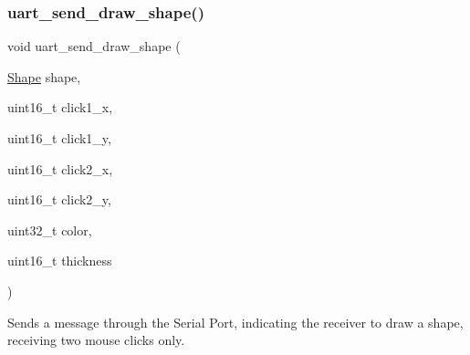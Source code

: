 \subsubsection{\texorpdfstring{uart\+\_\+send\+\_\+draw\+\_\+shape()}{uart\_send\_draw\_shape()}}
{\footnotesize\ttfamily void uart\+\_\+send\+\_\+draw\+\_\+shape (\begin{DoxyParamCaption}\item[{\mbox{\hyperlink{group__canvas_ga55b506070847a13554f8b879c1bfb37c}{Shape}}}]{shape,  }\item[{uint16\+\_\+t}]{click1\+\_\+x,  }\item[{uint16\+\_\+t}]{click1\+\_\+y,  }\item[{uint16\+\_\+t}]{click2\+\_\+x,  }\item[{uint16\+\_\+t}]{click2\+\_\+y,  }\item[{uint32\+\_\+t}]{color,  }\item[{uint16\+\_\+t}]{thickness }\end{DoxyParamCaption})}



Sends a message through the Serial Port, indicating the receiver to draw a shape, receiving two mouse clicks only. 


